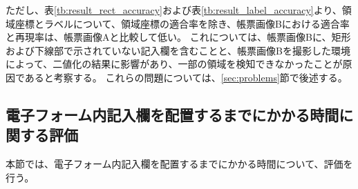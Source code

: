 ただし、表\ref{tb:result_rect_accuracy}および表\ref{tb:result_label_accuracy}より、領域座標とラベルについて、領域座標の適合率を除き、帳票画像Bにおける適合率と再現率は、帳票画像Aと比較して低い。
これについては、帳票画像Bに、矩形および下線部で示されていない記入欄を含むことと、帳票画像Bを撮影した環境によって、二値化の結果に影響があり、一部の領域を検知できなかったことが原因であると考察する。
これらの問題については、\ref{sec:problems}節で後述する。

\subsection{電子フォーム内記入欄を配置するまでにかかる時間に関する評価}\label{subsec:evalue_required_time}
本節では、電子フォーム内記入欄を配置するまでにかかる時間について、評価を行う。

